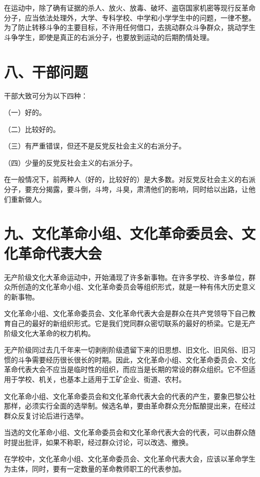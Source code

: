 在运动中，除了确有证据的杀人、放火、放毒、破坏、盗窃国家机密等现行反革命分子，应当依法处理外，大学、专科学校、中学和小学学生中的问题，一律不整。为了防止转移斗争的主要目标，不许用任何借口，去挑动群众斗争群众，挑动学生斗争学生，即使是真正的右派分子，也要放到运动的后期酌情处理。

\section{八、干部问题}

干部大致可分为以下四种：

（一）好的。

（二）比较好的。

（三）有严重错误，但还不是反党反社会主义的右派分子。

（四）少量的反党反社会主义的右派分子。

在一般情况下，前两种人（好的，比较好的）是大多数。对反党反社会主义的右派分子，要充分揭露，要斗倒，斗垮，斗臭，肃清他们的影响，同时给以出路，让他们重新做人。

\section{九、文化革命小组、文化革命委员会、文化革命代表大会}

无产阶级文化大革命运动中，开始涌现了许多新事物。在许多学校、许多单位，群众所创造的文化革命小组、文化革命委员会等组织形式，就是一种有伟大历史意义的新事物。

文化革命小组、文化革命委员会、文化革命代表大会是群众在共产党领导下自己教育自己的最好的新组织形式。它是我们党同群众密切联系的最好的桥梁。它是无产阶级文化大革命的权力机构。

无产阶级同过去几千年来一切剥削阶级遗留下来的旧思想、旧文化、旧风俗、旧习惯的斗争需要经历很长很长的时期。因此，文化革命小组、文化革命委员会、文化革命代表大会不应当是临时性的组织，而应当是长期的常设的群众组织。它不但适用于学校、机关，也基本上适用于工矿企业、街道、农村。

文化革命小组、文化革命委员会和文化革命代表大会的代表的产生，要象巴黎公社那样，必须实行全面的选举制。候选名单，要由革命群众充分酝酿提出来，在经过群众反复讨论后进行选举。

当选的文化革命小组、文化革命委员会和文化革命代表大会的代表，可以由群众随时提出批评，如果不称职，经过群众讨论，可以改选、撤换。

在学校中，文化革命小组、文化革命委员会、文化革命代表大会，应该以革命学生为主体，同时，要有一定数量的革命教师职工的代表参加。

